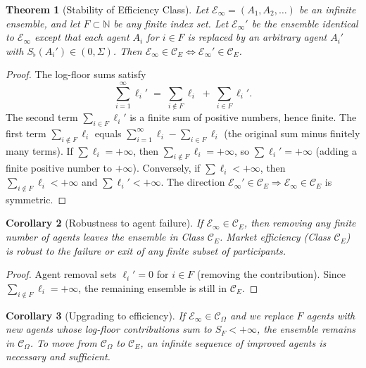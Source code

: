 \documentclass[twocolumn,11pt,a4paper]{article}
\newtheorem{theorem}{Theorem}[section]
\newtheorem{corollary}[theorem]{Corollary}
\theoremstyle{remark}
\newcommand{\N}{\mathbb{N}}
\newcommand{\Sflat}{S_{\flat}}
\newcommand{\Ens}{\mathcal{E}}
\newcommand{\ClassE}{\mathcal{C}_E}       %
\newcommand{\ClassO}{\mathcal{C}_\Omega}  %
\newcommand{\logfl}{\ell}                 %
\begin{document}
\begin{theorem}[Stability of Efficiency Class]
\label{thm:stability}
Let $\Ens_\infty = (A_1,A_2,\ldots)$ be an infinite ensemble, and let $F
\subset \N$ be any \emph{finite} index set.  Let $\Ens_\infty'$ be the
ensemble identical to $\Ens_\infty$ except that each agent $A_i$ for $i\in F$
is replaced by an arbitrary agent $A_i'$ with $\Sflat(A_i') \in (0,\Sigma)$.
Then $\Ens_\infty \in \ClassE \Leftrightarrow \Ens_\infty' \in \ClassE$.
\end{theorem}
\begin{proof}
The log-floor sums satisfy
\[
  \sum_{i=1}^\infty \logfl_i' \;=\; \sum_{i\notin F}\logfl_i
  \;+\; \sum_{i\in F}\logfl_i'.
\]
The second term $\sum_{i\in F}\logfl_i'$ is a finite sum of positive numbers,
hence finite.  The first term $\sum_{i\notin F}\logfl_i$ equals
$\sum_{i=1}^\infty \logfl_i - \sum_{i\in F}\logfl_i$ (the original sum minus
finitely many terms).  If $\sum \logfl_i = +\infty$, then
$\sum_{i\notin F}\logfl_i = +\infty$, so $\sum \logfl_i' = +\infty$ (adding
a finite positive number to $+\infty$).  Conversely, if $\sum \logfl_i <
+\infty$, then $\sum_{i\notin F}\logfl_i < +\infty$ and $\sum \logfl_i' <
+\infty$.  The direction $\Ens_\infty' \in \ClassE \Rightarrow \Ens_\infty
\in \ClassE$ is symmetric.
\end{proof}

\begin{corollary}[Robustness to agent failure]
\label{cor:failure}
If $\Ens_\infty \in \ClassE$, then removing any finite number of agents
leaves the ensemble in Class $\ClassE$.  Market efficiency (Class $\ClassE$)
is robust to the failure or exit of any finite subset of participants.
\end{corollary}
\begin{proof}
Agent removal sets $\logfl_i' = 0$ for $i \in F$ (removing the contribution).
Since $\sum_{i\notin F}\logfl_i = +\infty$, the remaining ensemble is still
in $\ClassE$.
\end{proof}

\begin{corollary}[Upgrading to efficiency]
\label{cor:upgrade}
If $\Ens_\infty \in \ClassO$ and we replace $F$ agents with new agents whose
log-floor contributions sum to $S_F < +\infty$, the ensemble remains in
$\ClassO$.  To move from $\ClassO$ to $\ClassE$, an \emph{infinite} sequence
of improved agents is necessary and sufficient.
\end{corollary}
\end{document}
